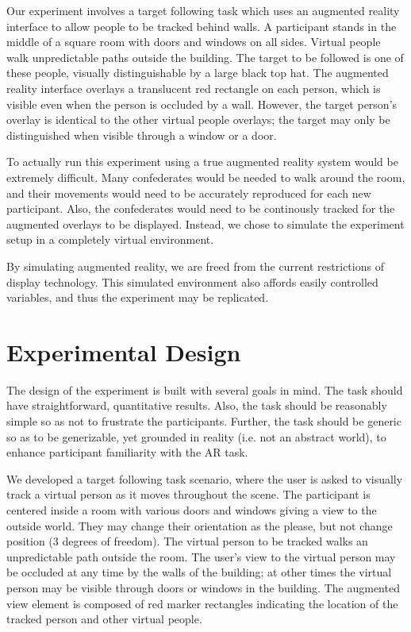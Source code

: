 \documentclass{acmsiggraph}                     %
\begin{document}
Our experiment involves a target following task which uses an augmented reality interface to allow people to be tracked behind walls.  A participant stands in the middle of a square room with doors and windows on all sides.  Virtual people walk unpredictable paths outside the building.  The target to be followed is one of these people, visually distinguishable by a large black top hat.  The augmented reality interface overlays a translucent red rectangle on each person, which is visible even when the person is occluded by a wall.  However, the target person's overlay is identical to the other virtual people overlays; the target may only be distinguished when visible through a window or a door.

To actually run this experiment using a true augmented reality system would be extremely difficult.  Many confederates would be needed to walk around the room, and their movements would need to be accurately reproduced for each new participant.  Also, the confederates would need to be continously tracked for the augmented overlays to be displayed.  Instead, we chose to simulate the experiment setup in a completely virtual environment.

By simulating augmented reality, we are freed from the current restrictions of display technology.  This simulated environment also affords easily controlled variables, and thus the experiment may be replicated.

\section{Experimental Design}

The design of the experiment is built with several goals in mind.  The task should have straightforward, quantitative results.  Also, the task should be reasonably simple so as not to frustrate the participants.  Further, the task should be generic so as to be generizable, yet grounded in reality (i.e. not an abstract world), to enhance participant familiarity with the AR task.

We developed a target following task scenario, where the user is asked to visually track a virtual person as it moves throughout the scene.  The participant is centered inside a room with various doors and windows giving a view to the outside world.  They may change their orientation as the please, but not change position (3 degrees of freedom).  The virtual person to be tracked walks an unpredictable path outside the room.  The user's view to the virtual person may be occluded at any time by the walls of the building; at other times the virtual person may be visible through doors or windows in the building.  The augmented view element is composed of red marker rectangles indicating the location of the tracked person and other virtual people.
\end{document}
